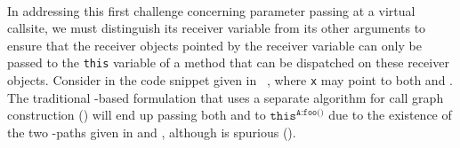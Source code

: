 





\paragraph{ \label{paragraph:chl1} } In addressing this first challenge concerning parameter passing 
at a virtual callsite, we
must distinguish its receiver variable from its other arguments to ensure that 
the receiver objects pointed by the receiver variable can only be passed to the \texttt{this} variable of 
a method  that can be dispatched on these receiver objects. Consider 
 in the code snippet given  in ~, where \texttt{x}
may point to both  and . The traditional \manuLFC-based
formulation that uses a separate algorithm for call graph construction  () will 
end up passing  both  and  to 
$\texttt{this}^{\texttt{A:foo()}}$ due to the existence of the two \manuLFC-paths given in
  and , 
although  is spurious ().




